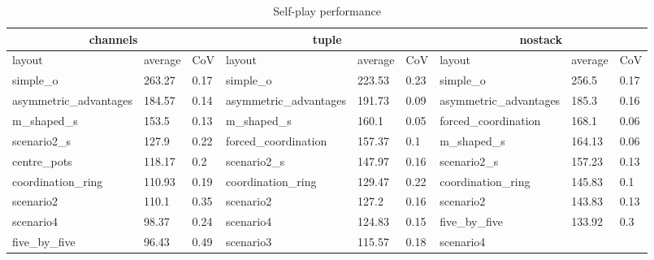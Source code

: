 \begin{table}[t]
\caption{ Self-play performance }
\begin{center}
\begin{tabular}{lll|lll|lll}
  \multicolumn{3}{c}{\textbf{ channels }}
    &
  \multicolumn{3}{c}{\textbf{ tuple }}
    &
  \multicolumn{3}{c}{\textbf{ nostack }}
 \\ \hline
    layout
    &
    average
    &
    CoV
    &
    layout
    &
    average
    &
    CoV
    &
    layout
    &
    average
    &
    CoV
  \\ \hline
        simple\_o
           &  263.27
           &  0.17
&
        simple\_o
           &  223.53
           &  0.23
&
        simple\_o
           &  256.5
           &  0.17
\\
        asymmetric\_advantages
           &  184.57
           &  0.14
&
        asymmetric\_advantages
           &  191.73
           &  0.09
&
        asymmetric\_advantages
           &  185.3
           &  0.16
\\
        m\_shaped\_s
           &  153.5
           &  0.13
&
        m\_shaped\_s
           &  160.1
           &  0.05
&
        forced\_coordination
           &  168.1
           &  0.06
\\
        scenario2\_s
           &  127.9
           &  0.22
&
        forced\_coordination
           &  157.37
           &  0.1
&
        m\_shaped\_s
           &  164.13
           &  0.06
\\
        centre\_pots
           &  118.17
           &  0.2
&
        scenario2\_s
           &  147.97
           &  0.16
&
        scenario2\_s
           &  157.23
           &  0.13
\\
        coordination\_ring
           &  110.93
           &  0.19
&
        coordination\_ring
           &  129.47
           &  0.22
&
        coordination\_ring
           &  145.83
           &  0.1
\\
        scenario2
           &  110.1
           &  0.35
&
        scenario2
           &  127.2
           &  0.16
&
        scenario2
           &  143.83
           &  0.13
\\
        scenario4
           &  98.37
           &  0.24
&
        scenario4
           &  124.83
           &  0.15
&
        five\_by\_five
           &  133.92
           &  0.3
\\
        five\_by\_five
           &  96.43
           &  0.49
&
        scenario3
           &  115.57
           &  0.18
&
        scenario4

\end{tabular}
\end{center}
\end{table}
